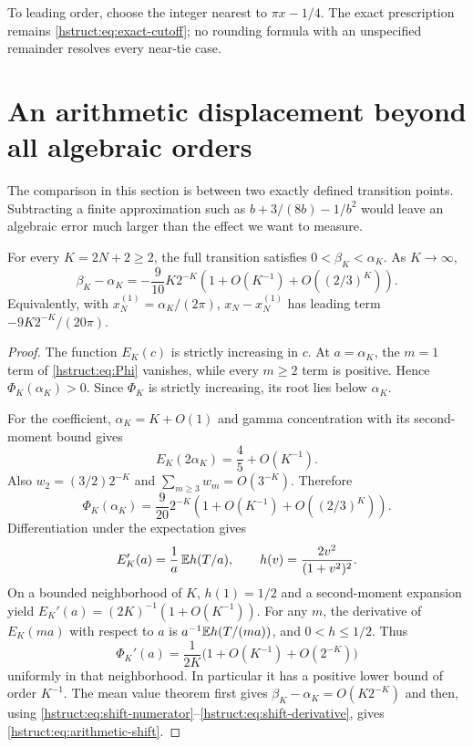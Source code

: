 To leading order, choose the integer nearest to $\pi x-1/4$.
The exact prescription remains \eqref{hstruct:eq:exact-cutoff}; no rounding
formula with an unspecified remainder resolves every near-tie case.

\section{An arithmetic displacement beyond all algebraic orders}
\label{hstruct:sec:arithmetic}

The comparison in this section is between two exactly defined
transition points. Subtracting a finite approximation such as
$b+3/(8b)-1/b^2$ would leave an algebraic error much larger than
the effect we want to measure.

\begin{theorem}\label{hstruct:thm:arithmetic-shift}
For every $K=2N+2\ge2$, the full transition satisfies
$0<\beta_K<\alpha_K$. As $K\to\infty$,
\begin{equation}\label{hstruct:eq:arithmetic-shift}
 \boxed{\displaystyle
 \beta_K-\alpha_K
 =-\frac9{10}K2^{-K}
  \left(1+O(K^{-1})+O((2/3)^K)\right).}
\end{equation}
Equivalently, with $x_N^{(1)}=\alpha_K/(2\pi)$,
$x_N-x_N^{(1)}$ has leading term $-9K2^{-K}/(20\pi)$.
\end{theorem}
\begin{proof}
The function $E_K(c)$ is strictly increasing in $c$. At
$a=\alpha_K$, the $m=1$ term of \eqref{hstruct:eq:Phi} vanishes, while
every $m\ge2$ term is positive. Hence $\Phi_K(\alpha_K)>0$.
Since $\Phi_K$ is strictly increasing, its root lies below $\alpha_K$.

For the coefficient, $\alpha_K=K+O(1)$ and gamma concentration
with its second-moment bound gives
\[
 E_K(2\alpha_K)=\frac45+O(K^{-1}).
\]
Also $w_2=(3/2)2^{-K}$ and $\sum_{m\ge3}w_m=O(3^{-K})$.
Therefore
\begin{equation}\label{hstruct:eq:shift-numerator}
 \Phi_K(\alpha_K)
 =\frac9{20}2^{-K}
   \left(1+O(K^{-1})+O((2/3)^K)\right).
\end{equation}
Differentiation under the expectation gives
\[
 E_K'(a)=\frac1a\,\mathbb E h(T/a),\qquad
 h(v)=\frac{2v^2}{(1+v^2)^2}.
\]
On a bounded neighborhood of $K$, $h(1)=1/2$ and a
second-moment expansion yield
$E_K'(a)=(2K)^{-1}(1+O(K^{-1}))$.
For any $m$, the derivative of $E_K(ma)$ with respect to $a$ is
$a^{-1}\mathbb E h(T/(ma))$, and $0<h\le1/2$. Thus
\begin{equation}\label{hstruct:eq:shift-derivative}
 \Phi_K'(a)=\frac1{2K}\bigl(1+O(K^{-1})+O(2^{-K})\bigr)
\end{equation}
uniformly in that neighborhood. In particular it has a positive
lower bound of order $K^{-1}$. The mean value theorem first gives
$\beta_K-\alpha_K=O(K2^{-K})$ and then, using
\eqref{hstruct:eq:shift-numerator}--\eqref{hstruct:eq:shift-derivative}, gives
\eqref{hstruct:eq:arithmetic-shift}.
\end{proof}

